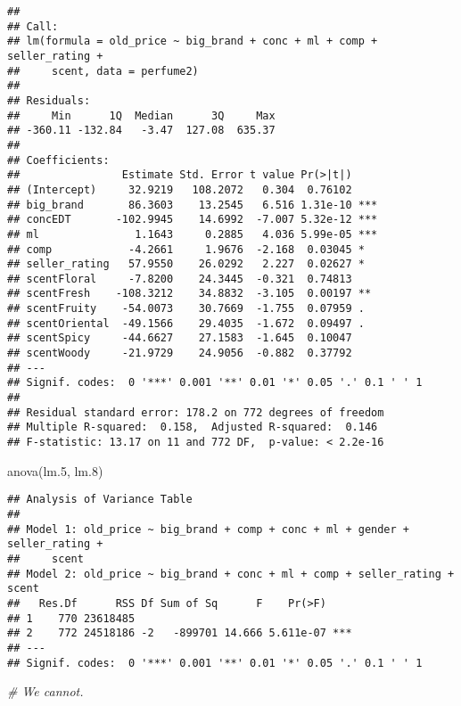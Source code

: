 \documentclass[
]{article}
\newenvironment{Shaded}{\begin{snugshade}}{\end{snugshade}}
\newcommand{\CommentTok}[1]{\textcolor[rgb]{0.56,0.35,0.01}{\textit{#1}}}
\newcommand{\FloatTok}[1]{\textcolor[rgb]{0.00,0.00,0.81}{#1}}
\newcommand{\FunctionTok}[1]{\textcolor[rgb]{0.00,0.00,0.00}{#1}}
\newcommand{\NormalTok}[1]{#1}
\begin{document}
\begin{verbatim}
## 
## Call:
## lm(formula = old_price ~ big_brand + conc + ml + comp + seller_rating + 
##     scent, data = perfume2)
## 
## Residuals:
##     Min      1Q  Median      3Q     Max 
## -360.11 -132.84   -3.47  127.08  635.37 
## 
## Coefficients:
##                Estimate Std. Error t value Pr(>|t|)    
## (Intercept)     32.9219   108.2072   0.304  0.76102    
## big_brand       86.3603    13.2545   6.516 1.31e-10 ***
## concEDT       -102.9945    14.6992  -7.007 5.32e-12 ***
## ml               1.1643     0.2885   4.036 5.99e-05 ***
## comp            -4.2661     1.9676  -2.168  0.03045 *  
## seller_rating   57.9550    26.0292   2.227  0.02627 *  
## scentFloral     -7.8200    24.3445  -0.321  0.74813    
## scentFresh    -108.3212    34.8832  -3.105  0.00197 ** 
## scentFruity    -54.0073    30.7669  -1.755  0.07959 .  
## scentOriental  -49.1566    29.4035  -1.672  0.09497 .  
## scentSpicy     -44.6627    27.1583  -1.645  0.10047    
## scentWoody     -21.9729    24.9056  -0.882  0.37792    
## ---
## Signif. codes:  0 '***' 0.001 '**' 0.01 '*' 0.05 '.' 0.1 ' ' 1
## 
## Residual standard error: 178.2 on 772 degrees of freedom
## Multiple R-squared:  0.158,  Adjusted R-squared:  0.146 
## F-statistic: 13.17 on 11 and 772 DF,  p-value: < 2.2e-16
\end{verbatim}

\begin{Shaded}
\begin{Highlighting}[]
\FunctionTok{anova}\NormalTok{(lm}\FloatTok{.5}\NormalTok{, lm}\FloatTok{.8}\NormalTok{)}
\end{Highlighting}
\end{Shaded}

\begin{verbatim}
## Analysis of Variance Table
## 
## Model 1: old_price ~ big_brand + comp + conc + ml + gender + seller_rating + 
##     scent
## Model 2: old_price ~ big_brand + conc + ml + comp + seller_rating + scent
##   Res.Df      RSS Df Sum of Sq      F    Pr(>F)    
## 1    770 23618485                                  
## 2    772 24518186 -2   -899701 14.666 5.611e-07 ***
## ---
## Signif. codes:  0 '***' 0.001 '**' 0.01 '*' 0.05 '.' 0.1 ' ' 1
\end{verbatim}

\begin{Shaded}
\begin{Highlighting}[]
\CommentTok{\# We cannot.}
\end{Highlighting}
\end{Shaded}
\end{document}
